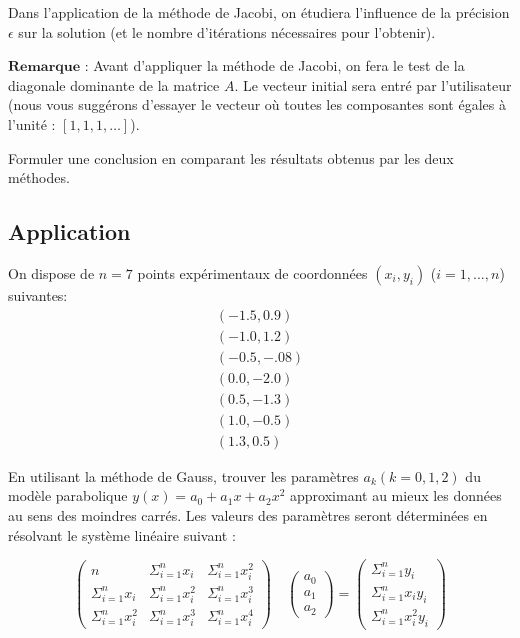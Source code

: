 \documentclass[11pt]{article}
\begin{document}
Dans l'application de la méthode de Jacobi, on étudiera l'influence de
la précision \(\epsilon\) sur la solution (et le nombre d'itérations
nécessaires pour l'obtenir).

\(\textbf{Remarque}\) : Avant d'appliquer la méthode de Jacobi, on fera
le test de la diagonale dominante de la matrice \(A\). Le vecteur
initial sera entré par l'utilisateur (nous vous suggérons d'essayer le
vecteur où toutes les composantes sont égales à l'unité :
\([1,1,1,\ldots]\)).

Formuler une conclusion en comparant les résultats obtenus par les deux
méthodes.

    \subsection{Application}\label{application}

    On dispose de \(n = 7\) points expérimentaux de coordonnées
\((x_i,y_i)\) (\(i=1,...,n\)) suivantes: \[
\begin{array}{l}
(-1.5, 0.9)\\
(-1.0, 1.2)\\ 
(-0.5, -.08)\\ 
(0.0, -2.0)\\ 
(0.5, -1.3)\\
(1.0, -0.5)\\
(1.3, 0.5)
\end{array} 
\]

En utilisant la méthode de Gauss, trouver les paramètres
\(a_k (k = 0,1,2)\) du modèle parabolique
\(y(x) = a_0 + a_1 x + a_2 x^2\) approximant au mieux les données au
sens des moindres carrés. Les valeurs des paramètres seront déterminées
en résolvant le système linéaire suivant :

\[
\left( \begin{array}{ccc}
n & \Sigma_{i=1}^{n} x_i & \Sigma_{i=1}^{n} x_i^2\\
\Sigma_{i=1}^{n} x_i & \Sigma_{i=1}^{n} x_i^2 & \Sigma_{i=1}^{n} x_i^3 \\
\Sigma_{i=1}^{n} x_i^2 & \Sigma_{i=1}^{n} x_i^3 & \Sigma_{i=1}^{n} x_i^4 
\end{array} \right)
\quad 
\left( \begin{array}{c}
a_0 \\
a_1 \\
a_2
\end{array} \right)
= 
\left( \begin{array}{c}
\Sigma_{i=1}^{n} y_i \\
\Sigma_{i=1}^{n} x_i y_i \\
\Sigma_{i=1}^{n} x_i^2 y_i 
\end{array} \right)
\]
\end{document}
